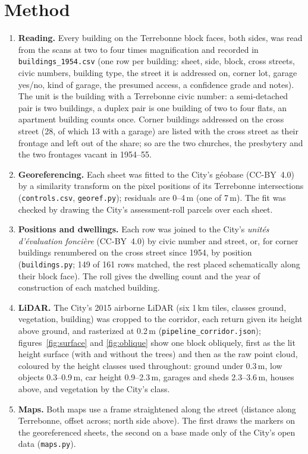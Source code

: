\documentclass[11pt]{article}
\begin{document}
\section{Method}
\begin{enumerate}
\item \textbf{Reading.} Every building on the Terrebonne block faces, both sides, was read from the scans at two to four times magnification and recorded in \texttt{buildings\_1954.csv} (one row per building: sheet, side, block, cross streets, civic numbers, building type, the street it is addressed on, corner lot, garage yes/no, kind of garage, the presumed access, a confidence grade and notes). The unit is the building with a Terrebonne civic number: a semi-detached pair is two buildings, a duplex pair is one building of two to four flats, an apartment building counts once. Corner buildings addressed on the cross street (28, of which 13 with a garage) are listed with the cross street as their frontage and left out of the share; so are the two churches, the presbytery and the two frontages vacant in 1954--55.
\item \textbf{Georeferencing.} Each sheet was fitted to the City's géobase (CC-BY~4.0) by a similarity transform on the pixel positions of its Terrebonne intersections (\texttt{controls.csv}, \texttt{georef.py}); residuals are 0--4\,m (one of 7\,m). The fit was checked by drawing the City's assessment-roll parcels over each sheet.
\item \textbf{Positions and dwellings.} Each row was joined to the City's \emph{unités d'évaluation foncière} (CC-BY~4.0) by civic number and street, or, for corner buildings renumbered on the cross street since 1954, by position (\texttt{buildings.py}; 149 of 161 rows matched, the rest placed schematically along their block face). The roll gives the dwelling count and the year of construction of each matched building.
\item \textbf{LiDAR.} The City's 2015 airborne LiDAR (six 1\,km tiles, classes ground, vegetation, building) was cropped to the corridor, each return given its height above ground, and rasterized at 0.2\,m (\texttt{pipeline\_corridor.json}); figures~\ref{fig:surface} and \ref{fig:oblique} show one block obliquely, first as the lit height surface (with and without the trees) and then as the raw point cloud, coloured by the height classes used throughout: ground under 0.3\,m, low objects 0.3--0.9\,m, car height 0.9--2.3\,m, garages and sheds 2.3--3.6\,m, houses above, and vegetation by the City's class. 
\item \textbf{Maps.} Both maps use a frame straightened along the street (distance along Terrebonne, offset across; north side above). The first draws the markers on the georeferenced sheets, the second on a base made only of the City's open data (\texttt{maps.py}).
\end{enumerate}
\end{document}
